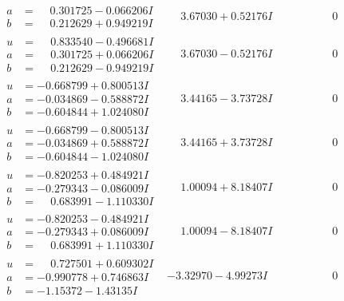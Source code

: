 \documentclass[1p]{elsarticle_modified}
\theoremstyle{definition}
\begin{document}
$$\begin{array}{c|c|c}
\begin{aligned}
a &= \phantom{-}0.301725 - 0.066206 I \\
b &= \phantom{-}0.212629 + 0.949219 I\end{aligned}
 & \phantom{-}3.67030 + 0.52176 I & \phantom{-0.000000 } 0 \\ \hline\begin{aligned}
u &= \phantom{-}0.833540 - 0.496681 I \\
a &= \phantom{-}0.301725 + 0.066206 I \\
b &= \phantom{-}0.212629 - 0.949219 I\end{aligned}
 & \phantom{-}3.67030 - 0.52176 I & \phantom{-0.000000 } 0 \\ \hline\begin{aligned}
u &= -0.668799 + 0.800513 I \\
a &= -0.034869 - 0.588872 I \\
b &= -0.604844 + 1.024080 I\end{aligned}
 & \phantom{-}3.44165 - 3.73728 I & \phantom{-0.000000 } 0 \\ \hline\begin{aligned}
u &= -0.668799 - 0.800513 I \\
a &= -0.034869 + 0.588872 I \\
b &= -0.604844 - 1.024080 I\end{aligned}
 & \phantom{-}3.44165 + 3.73728 I & \phantom{-0.000000 } 0 \\ \hline\begin{aligned}
u &= -0.820253 + 0.484921 I \\
a &= -0.279343 - 0.086009 I \\
b &= \phantom{-}0.683991 - 1.110330 I\end{aligned}
 & \phantom{-}1.00094 + 8.18407 I & \phantom{-0.000000 } 0 \\ \hline\begin{aligned}
u &= -0.820253 - 0.484921 I \\
a &= -0.279343 + 0.086009 I \\
b &= \phantom{-}0.683991 + 1.110330 I\end{aligned}
 & \phantom{-}1.00094 - 8.18407 I & \phantom{-0.000000 } 0 \\ \hline\begin{aligned}
u &= \phantom{-}0.727501 + 0.609302 I \\
a &= -0.990778 + 0.746863 I \\
b &= -1.15372 - 1.43135 I\end{aligned}
 & -3.32970 - 4.99273 I & \phantom{-0.000000 } 0 \\ \hline\begin{aligned}

\end{aligned}
\end{array}$$
\end{document}
